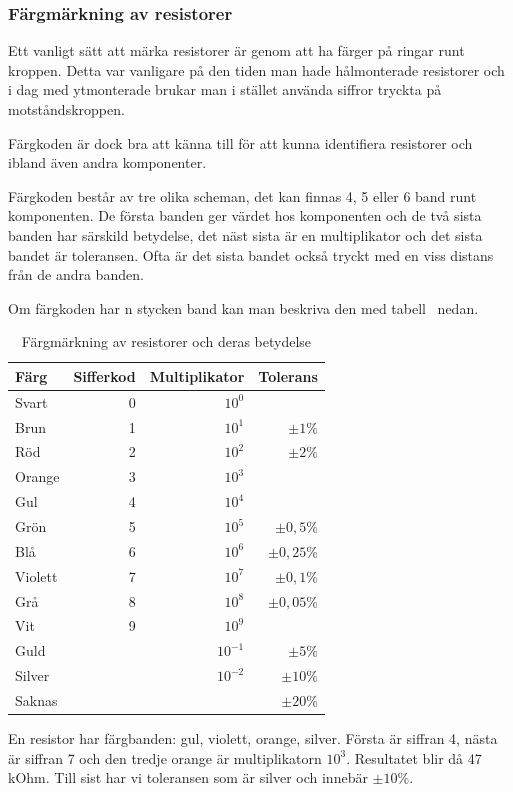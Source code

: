 \subsubsection{Färgmärkning av resistorer}

Ett vanligt sätt att märka resistorer är genom att ha färger på ringar runt
kroppen.
Detta var vanligare på den tiden man hade hålmonterade resistorer och i dag med
ytmonterade brukar man i stället använda siffror tryckta på motståndskroppen.

Färgkoden är dock bra att känna till för att kunna identifiera resistorer
och ibland även andra komponenter.

Färgkoden består av tre olika scheman, det kan finnas 4, 5 eller 6 band runt
komponenten.
De första banden ger värdet hos komponenten och de två sista banden har särskild
betydelse, det näst sista är en multiplikator och det sista bandet är
toleransen.
Ofta är det sista bandet också tryckt med en viss distans från de andra banden.

Om färgkoden har n stycken band kan man beskriva den med
tabell~ nedan.

\begin{table}[H]
\begin{tabular}{lrrr}
	\textbf{Färg}    & \textbf{Sifferkod} &     \textbf{Multiplikator} 
	&     \textbf{Tolerans} \\ \hline \hline
	Svart   &         0 &    $10^0$ &              \\ \hline
	Brun    &         1 &    $10^1$ &    $\pm 1\%$ \\ \hline
	Röd     &         2 &    $10^2$ &    $\pm 2\%$ \\ \hline
	Orange  &         3 &    $10^3$ &              \\ \hline
	Gul     &         4 &    $10^4$ &              \\ \hline
	Grön    &         5 &    $10^5$ &  $\pm 0,5\%$ \\ \hline
	Blå     &         6 &    $10^6$ & $\pm 0,25\%$ \\ \hline
	Violett &         7 &    $10^7$ &  $\pm 0,1\%$ \\ \hline
	Grå     &         8 &    $10^8$ & $\pm 0,05\%$ \\ \hline
	Vit     &         9 &    $10^9$ &              \\ \hline
	Guld    &           & $10^{-1}$ &    $\pm 5\%$ \\ \hline
	Silver  &           & $10^{-2}$ &   $\pm 10\%$ \\ \hline
	Saknas  &           &           &   $\pm 20\%$ \\ \hline
\end{tabular}
\caption{Färgmärkning av resistorer och deras betydelse}
\label{tab:rcolors}
\end{table}

\begin{exempelbox}
En resistor har färgbanden: gul, violett, orange, silver.
\tcblower
Första är siffran 4, nästa är siffran 7 och den tredje orange är
multiplikatorn $10^3$.
Resultatet blir då 47\,kOhm.
Till sist har vi toleransen som är silver och innebär $\pm 10\%$.
\end{exempelbox}

